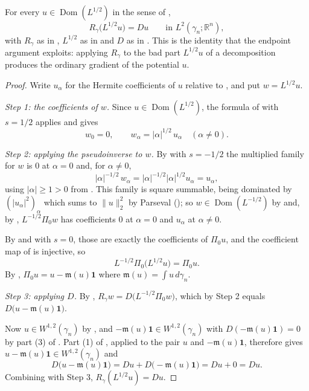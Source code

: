 \begin{lemma}[The structural identity $R_\gamma L^{1/2} u = Du$]
For every $u \in \operatorname{Dom}(L^{1/2})$ in the sense of
,
\[
  R_\gamma\bigl(L^{1/2}u\bigr) = Du
  \qquad\text{in } L^2(\gamma_n;\mathbb{R}^n),
\]
with $R_\gamma$ as in , $L^{1/2}$ as in 
and $D$ as in .  This is the identity that the endpoint argument
exploits: applying $R_\gamma$ to the bad part $L^{1/2}u$ of a decomposition
produces the ordinary gradient of the potential $u$.
\end{lemma}
\begin{proof}
Write $u_\alpha$ for the Hermite coefficients of $u$ relative to
, and put $w = L^{1/2}u$.

\emph{Step 1: the coefficients of $w$.}
Since $u \in \operatorname{Dom}(L^{1/2})$, the formula of  with
$s = 1/2$ applies and gives
\[
  w_0 = 0, \qquad w_\alpha = |\alpha|^{1/2}\,u_\alpha \quad (\alpha \neq 0).
\]

\emph{Step 2: applying the pseudoinverse to $w$.}
By  with $s = -1/2$ the multiplied family for $w$ is $0$ at
$\alpha = 0$ and, for $\alpha \neq 0$,
\[
  |\alpha|^{-1/2}\, w_\alpha = |\alpha|^{-1/2}|\alpha|^{1/2}u_\alpha = u_\alpha ,
\]
using $|\alpha| \geq 1 > 0$ from .  This family is square
summable, being dominated by $(|u_\alpha|^2)_\alpha$ which sums to $\|u\|_2^2$ by
Parseval (); so $w \in \operatorname{Dom}(L^{-1/2})$ by
 and, by ,
$L^{-1/2}\Pi_0 w$ has coefficients $0$ at $\alpha = 0$ and $u_\alpha$ at
$\alpha \neq 0$.

By  and  with $s = 0$, those are exactly
the coefficients of $\Pi_0 u$, and the coefficient map of 
is injective, so
\[
  L^{-1/2}\Pi_0\bigl(L^{1/2}u\bigr) = \Pi_0 u .
\]
By , $\Pi_0 u = u - \mathfrak{m}(u)\mathbf{1}$ where
$\mathfrak{m}(u) = \int u \, d\gamma_n$.

\emph{Step 3: applying $D$.}
By , $R_\gamma w = D\bigl(L^{-1/2}\Pi_0 w\bigr)$, which by
Step 2 equals $D\bigl(u - \mathfrak{m}(u)\mathbf{1}\bigr)$.

Now $u \in W^{1,2}(\gamma_n)$ by , and
$-\mathfrak{m}(u)\mathbf{1} \in W^{1,2}(\gamma_n)$ with
$D(-\mathfrak{m}(u)\mathbf{1}) = 0$ by part (3) of .  Part
(1) of , applied to the pair
$u$ and $-\mathfrak{m}(u)\mathbf{1}$, therefore gives
$u - \mathfrak{m}(u)\mathbf{1} \in W^{1,2}(\gamma_n)$ and
\[
  D\bigl(u - \mathfrak{m}(u)\mathbf{1}\bigr)
    = Du + D\bigl(-\mathfrak{m}(u)\mathbf{1}\bigr) = Du + 0 = Du .
\]
Combining with Step 3, $R_\gamma(L^{1/2}u) = Du$.
\end{proof}
